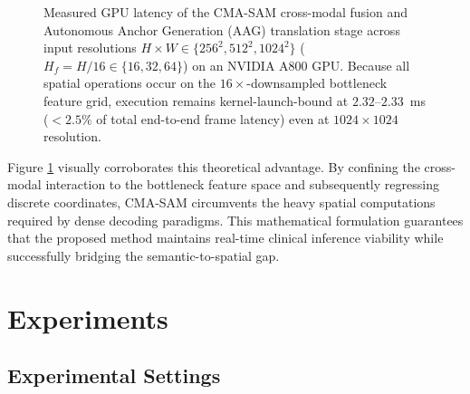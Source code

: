 \documentclass[onecolumn]{IEEEtran}
\numberwithin{equation}{section}
\theoremstyle{definition}
\theoremstyle{remark}
\begin{document}
\begin{figure}[!htbp]
\centering
{}
\caption{Measured GPU latency of the CMA-SAM cross-modal fusion and Autonomous Anchor Generation (AAG) translation stage across input resolutions $H \times W \in \{256^2, 512^2, 1024^2\}$ ($H_f = H/16 \in \{16, 32, 64\}$) on an NVIDIA A800 GPU. Because all spatial operations occur on the $16\times$-downsampled bottleneck feature grid, execution remains kernel-launch-bound at $2.32$--$2.33$~ms ($<2.5\%$ of total end-to-end frame latency) even at $1024 \times 1024$ resolution.}
\label{fig:complexity_plot}
\end{figure}

Figure \ref{fig:complexity_plot} visually corroborates this theoretical advantage. By confining the cross-modal interaction to the bottleneck feature space and subsequently regressing discrete coordinates, CMA-SAM circumvents the heavy spatial computations required by dense decoding paradigms. This mathematical formulation guarantees that the proposed method maintains real-time clinical inference viability while successfully bridging the semantic-to-spatial gap.
\section{Experiments}

\subsection{Experimental Settings}
\end{document}
